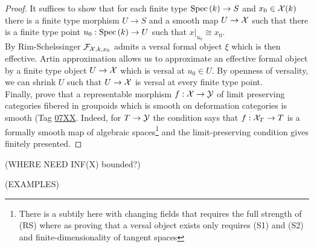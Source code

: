 \documentclass[12pt]{article}
\begin{document}
\begin{proof}
It suffices to show that for each finite type $\mathrm{Spec}\left( k \right) \to S$ and $x_0 \in \mathcal{X}(k)$ there is a finite type morphism $U \to S$ and a smooth map $U \to \mathcal{X}$ such that there is a finite type point $u_0 : \mathrm{Spec}\left( k \right) \to U$ such that $x|_{u_0} \cong x_0$.
\bigskip\\
By Rim-Schelssinger $\mathcal{F}_{\mathcal{X}, k, x_0}$ admits a versal formal object $\xi$ which is then effective. Artin approximation allows us to approximate an effective formal object by a finite type object $U \to \mathcal{X}$ which is versal at $u_0 \in U$. By openness of versality, we can shrink $U$ such that $U \to \mathcal{X}$ is versal at every finite type point.  
\bigskip\\
Finally, prove that a representable morphism $f : \mathcal{X} \to \mathcal{Y}$ of limit preserving categories fibered in groupoids which is smooth on deformation categories is smooth (Tag \href{https://stacks.math.columbia.edu/tag/07XX}{07XX}. Indeed, for $T \to \mathcal{Y}$ the condition says that $f : \mathcal{X}_T \to T$ is a formally smooth map of algebraic spaces\footnote{There is a subtily here with changing fields that requires the full strength of (RS) where as proving that a versal object exists only requires (S1) and (S2) and finite-dimensionality of tangent spaces} and the limit-preserving condition gives finitely presented. 
\end{proof}

(WHERE NEED INF(X) bounded?)

(EXAMPLES)
\end{document}
